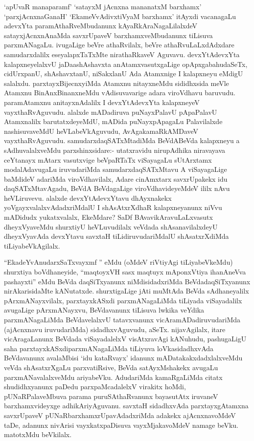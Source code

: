 \begin{artha}
`apUvaR manaparamf' `satayxM jAcnxna mananatxM barxhamx' `parxjAcnxnaGanaH' `EkameVvAdivxtiVyaM barxhamx' itAyxdi vacanagaLu adevxYta paramAthaRveMbudanunx kAyaRkAraNagaLilalxdeV satayxjAcnxnAnaMda savxrUpaveV barxhamxveMbudanunx tiLisuva parxmANagaLu. ivugaLige beVre athaRvilalx, beVre athaRvuLaLxdAdxdare samudarxdalilx eseyalapxTaTxMte nirathaRkaveV Aguvavu. devxYtAdevxYta kalapxneyelalxvU jaDaashAshavxta anAtamxvasutxgaLige opApxgabahudaSeTx, cidUrxpanU, shAshavxtanU, niSakxlanU Ada Atamxnige I kalapxneyu eMdigU salalxdu. parxtayxBijecnxyiMda Atamxnu nitayxneMdu sididhxsida meVle Atamxnu BinAnxBinanxneMdu vAdisuvavarige adara viroVdhavu baruvudu. paramAtamxnu anitayxnAdalilx I devxYtAdevxYta kalapxneyeV vayxthaRvAguvudu. alalxde mADadiruva puNayxPalavU pApaPalavU Atamxnalilx barutatxdeyeMdU, mADida puNayxpApagaLu Palavilalxde nashisuvaveMdU heVLabeVkAguvudu, AvAgakamaRkAMDaveV vayxthaRvAguvudu. samudarxdaqSATxMtadiMda BeVdABeVda kalapxneyu a sAdhuvalalxveMdu parxshinxsidare:- utatxravidu nirupAdhika niravayava ceYtanayx mAtarx vasutxvige beVpaRTaTx viSayagaLu sUtArxtamx modalAdavugaLu iruvudariMda samudarxdaqSATxMtavu A viSayagaLige baMdideV adariMda viroVdhavilalx, Adare cinAmxtarx savxrUpakekx idu daqSATxMtavAgadu, BeVdA BeVdagaLige viroVdhavideyeMdeV ililx nAvu heVLiruvevu. alalxde devxYtAdevxYtavu dhAyxnakekx yoVgayxvalalxvAdadxriMdalU I shAsAtxrXdhaR kalapxneyanunx niVvu mADidudx yukatxvalalx, EkeMdare? SaDf BAvavikAravuLaLxvasutx dheyxVyaveMdu shurxtiyU heVLuvudilalx veVdada shAsanavilalxdeyU dheyxVyavAda devxYtavu savxtaH tiLidiruvudariMdalU shAsatxrXdiMda tiLiyabeVkAgilalx.
\end{artha}

\begin{artha}
``EkadeYvAnudarxSaTxvayxmf '' eMdu (oMdeV riVtiyAgi tiLiyabeVkeMdu) shurxtiya boVdhaneyide, ``maqtoyxVH sasx maqtuyx mAponxVtiya ihanAneVva pashayxti'' eMdu BeVda daqSiTxyanunx niMdisidadxriMda BeVdadaqSiTxyanunx nirAkarisidaMte kANutatxde. shurxtigaLige jAti muMtAda BeVda sAdhaneyalilx pArxmANayxvilalx, parxtayxkASxdi parxmANagaLiMda tiLiyada viSayadalilx avugaLige pArxmANayxvu, BeVdavanunx tiLisuva lwkika veYdika parxmANagaLiMda BeVdavelalxvU tatavxvanunx vicAramADadiruvudariMda (ajAcnxnavu iruvudariMda) sidadhxvAguvudu, aSeTx. nijavAgilalx, itare vicAragaLanunx BeVdada viSayadalelxV visAtxravAgi kANuhudu, pashugaLigU saha parxtayxkASxdiparxmANagaLiMda tiLiyuva loVkasidadhxvAda BeVdavanunx avalaMbisi `idu kataRvayx' idanunx mADatakakxdadxlalxveMdu veVda shAsatxrXgaLu parxvatiRsive, BeVda satAyxMshakekx avugaLu parxmANavalalxveMdu ariyabeVku. AdudariMda kamaRgaLiMda citatx shudidhxyanunx paDedu parxpaMcadalelxV virakitx hoMdi, pUNaRPalaveMbuva parama puruSAthaRvanunx bayasutAtx iruvaneV barxhamxvideyxge adhikAriyAguvanu. savxtaH sidadhxvAda parxtayxgAtamxna savxrUpaveV pUNaRbarxhamxrUpavAdadxriMda adakekx ajAcnxnavoMdeV taDe, adanunx nivArisi vayxkatxpaDisuva vayxMjakavoMdeV namage beVku. matotxMdu beVkilalx.
\end{artha}


